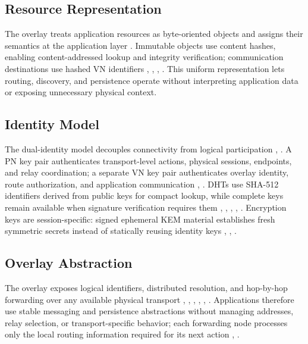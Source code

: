 \documentclass[
  12pt,
  oneside,
  a4paper,
  chapter=TITLE,
  section=TITLE,
  english,
  brazil
]{abntex2}
\begin{document}
\subsection{Resource Representation}

The overlay treats application resources as byte-oriented objects and assigns their semantics at the application layer \cite{augustine2022byzantine}. Immutable objects use content hashes, enabling content-addressed lookup and integrity verification; communication destinations use hashed VN identifiers \cite{li2022unreachable}, \cite{augustine2022byzantine}, \cite{mirzaei2018pk}, \cite{qian2016garlic}. This uniform representation lets routing, discovery, and persistence operate without interpreting application data or exposing unnecessary physical context.

\subsection{Identity Model}

The dual-identity model decouples connectivity from logical participation \cite{li2022unreachable}, \cite{mirzaei2018pk}. A PN key pair authenticates transport-level actions, physical sessions, endpoints, and relay coordination; a separate VN key pair authenticates overlay identity, route authorization, and application communication \cite{mirzaei2018pk}, \cite{qian2016garlic}. DHTs use SHA-512 identifiers derived from public keys for compact lookup, while complete keys remain available when signature verification requires them \cite{stoica2001chord}, \cite{maymounkov2002kademlia}, \cite{rowstron2001pastry}, \cite{augustine2022byzantine}, \cite{mirzaei2018pk}. Encryption keys are session-specific: signed ephemeral KEM material establishes fresh symmetric secrets instead of statically reusing identity keys \cite{mirzaei2018pk}, \cite{bos2017kyber}, \cite{nist2024fips203}.

\subsection{Overlay Abstraction}

The overlay exposes logical identifiers, distributed resolution, and hop-by-hop forwarding over any available physical transport \cite{stoica2001chord}, \cite{maymounkov2002kademlia}, \cite{rowstron2001pastry}, \cite{li2022unreachable}, \cite{augustine2022byzantine}, \cite{mirzaei2018pk}. Applications therefore use stable messaging and persistence abstractions without managing addresses, relay selection, or transport-specific behavior; each forwarding node processes only the local routing information required for its next action \cite{mirzaei2018pk}, \cite{qian2016garlic}.
\end{document}
